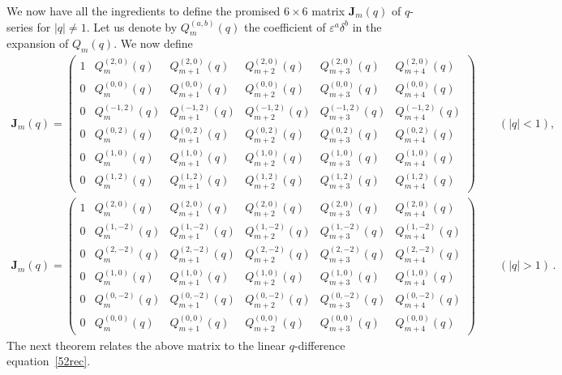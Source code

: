 \documentclass[12pt,reqno]{amsart}
\theoremstyle{definition}
\def\be{\begin{equation}}
\def\ee{\end{equation}}
\def\ve{\varepsilon}
\def\bJ{\mathbf J}
\def\DS{Q} %
\begin{document}
We now have all the ingredients to define the promised $6 \times 6$ matrix
$\bJ_{m}(q)$ of $q$-series for $|q| \neq 1$. Let us denote by $\DS_{m}^{(a,b)}(q)$
the coefficient of $\ve^{a}\delta^{b}$ in the expansion of $\DS_{m}(q)$.
We now define
{\small
\be
\label{Jq6x6}
\begin{aligned}
  \bJ_{m}(q)=
  \begin{pmatrix}
    1 & \DS^{(2,0)}_{m}(q) & \DS^{(2,0)}_{m+1}(q) &
    \DS^{(2,0)}_{m+2}(q) & \DS^{(2,0)}_{m+3}(q) & \DS^{(2,0)}_{m+4}(q)\\
    0 & \DS^{(0,0)}_{m}(q) & \DS^{(0,0)}_{m+1}(q) & \DS^{(0,0)}_{m+2}(q)
    & \DS^{(0,0)}_{m+3}(q) & \DS^{(0,0)}_{m+4}(q)\\
    0 & \DS^{(-1,2)}_{m}(q) & \DS^{(-1,2)}_{m+1}(q) & \DS^{(-1,2)}_{m+2}(q)
    & \DS^{(-1,2)}_{m+3}(q) & \DS^{(-1,2)}_{m+4}(q)\\
    0 & \DS^{(0,2)}_{m}(q) & \DS^{(0,2)}_{m+1}(q) & \DS^{(0,2)}_{m+2}(q)
    & \DS^{(0,2)}_{m+3}(q) & \DS^{(0,2)}_{m+4}(q)\\
    0 & \DS^{(1,0)}_{m}(q) & \DS^{(1,0)}_{m+1}(q) & \DS^{(1,0)}_{m+2}(q)
    & \DS^{(1,0)}_{m+3}(q) & \DS^{(1,0)}_{m+4}(q)\\
    0 & \DS^{(1,2)}_{m}(q) & \DS^{(1,2)}_{m+1}(q) & \DS^{(1,2)}_{m+2}(q)
    & \DS^{(1,2)}_{m+3}(q) & \DS^{(1,2)}_{m+4}(q)
  \end{pmatrix}
  \qquad (|q|<1),\\
  \bJ_{m}(q)=
  \begin{pmatrix}
    1 & \DS^{(2,0)}_{m}(q) & \DS^{(2,0)}_{m+1}(q)
    & \DS^{(2,0)}_{m+2}(q) & \DS^{(2,0)}_{m+3}(q) & \DS^{(2,0)}_{m+4}(q)\\
    0 & \DS^{(1,-2)}_{m}(q) & \DS^{(1,-2)}_{m+1}(q) & \DS^{(1,-2)}_{m+2}(q)
    & \DS^{(1,-2)}_{m+3}(q) & \DS^{(1,-2)}_{m+4}(q)\\
    0 & \DS^{(2,-2)}_{m}(q) & \DS^{(2,-2)}_{m+1}(q) & \DS^{(2,-2)}_{m+2}(q)
    & \DS^{(2,-2)}_{m+3}(q) & \DS^{(2,-2)}_{m+4}(q)\\
    0 & \DS^{(1,0)}_{m}(q) & \DS^{(1,0)}_{m+1}(q) & \DS^{(1,0)}_{m+2}(q)
    & \DS^{(1,0)}_{m+3}(q) & \DS^{(1,0)}_{m+4}(q)\\
    0 & \DS^{(0,-2)}_{m}(q) & \DS^{(0,-2)}_{m+1}(q) & \DS^{(0,-2)}_{m+2}(q)
    & \DS^{(0,-2)}_{m+3}(q) & \DS^{(0,-2)}_{m+4}(q)\\
    0 & \DS^{(0,0)}_{m}(q) & \DS^{(0,0)}_{m+1}(q) & \DS^{(0,0)}_{m+2}(q)
    & \DS^{(0,0)}_{m+3}(q) & \DS^{(0,0)}_{m+4}(q)
  \end{pmatrix}
  \qquad (|q|>1)\,.
\end{aligned}
\ee
}
The next theorem relates the above matrix to the linear $q$-difference
equation~\eqref{52rec}.
\end{document}
